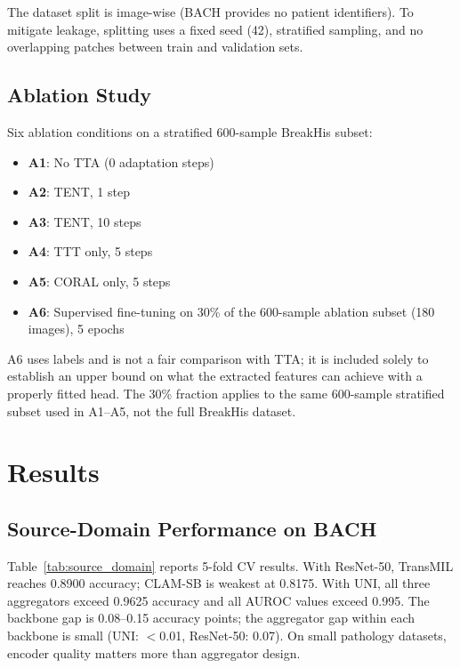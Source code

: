 \documentclass[conference]{IEEEtran}
\begin{document}
The dataset split is image-wise (BACH provides no patient identifiers). To mitigate leakage, splitting uses a fixed seed (42), stratified sampling, and no overlapping patches between train and validation sets.

\subsection{Ablation Study}

Six ablation conditions on a stratified 600-sample BreakHis subset:

\begin{itemize}
    \item \textbf{A1}: No TTA (0 adaptation steps)
    \item \textbf{A2}: TENT, 1 step
    \item \textbf{A3}: TENT, 10 steps
    \item \textbf{A4}: TTT only, 5 steps
    \item \textbf{A5}: CORAL only, 5 steps
    \item \textbf{A6}: Supervised fine-tuning on 30\% of the 600-sample ablation subset (180 images), 5 epochs
\end{itemize}

A6 uses labels and is not a fair comparison with TTA; it is included solely to establish an upper bound on what the extracted features can achieve with a properly fitted head. The 30\% fraction applies to the same 600-sample stratified subset used in A1--A5, not the full BreakHis dataset.

\section{Results}
\label{sec:results}

\subsection{Source-Domain Performance on BACH}

Table~\ref{tab:source_domain} reports 5-fold CV results. With ResNet-50, TransMIL reaches 0.8900 accuracy; CLAM-SB is weakest at 0.8175. With UNI, all three aggregators exceed 0.9625 accuracy and all AUROC values exceed 0.995. The backbone gap is 0.08--0.15 accuracy points; the aggregator gap within each backbone is small (UNI: $<$0.01, ResNet-50: 0.07). On small pathology datasets, encoder quality matters more than aggregator design.
\end{document}
